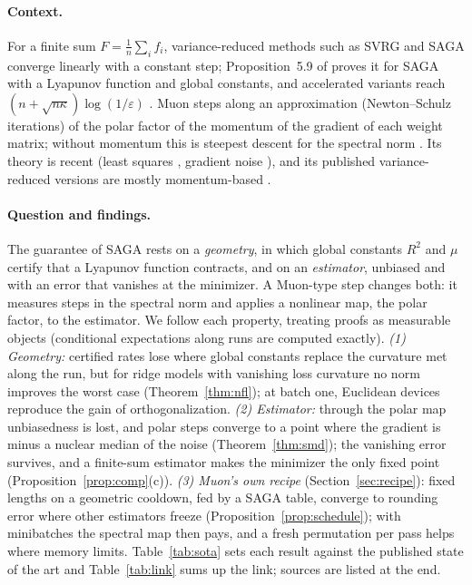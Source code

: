\documentclass[10pt]{article}
\theoremstyle{remark}
\begin{document}
\paragraph{Context.} For a finite sum $F=\frac1n\sum_if_i$, variance-reduced methods such as SVRG
\cite{johnson2013accelerating} and SAGA \cite{defazio2014saga} converge linearly with a constant step; Proposition~5.9 of
\cite{bach2024learning} proves it for SAGA with a Lyapunov function and global constants, and accelerated variants reach
$(n+\sqrt{n\kappa})\log(1/\varepsilon)$ \cite{allenzhu2018katyusha,kovalev2020dont,lan2018optimal}. Muon
\cite{jordan2024muon} steps along an approximation (Newton--Schulz iterations) of the polar factor of the momentum of the
gradient of each weight matrix; without momentum this is steepest descent for the spectral norm
\cite{carlson2015stochastic,bernstein2024old}. Its theory is recent (least squares
\cite{shulgin2026quadratic,vasudeva2025muon}, gradient noise \cite{xie2026muon,chen2026when,paquette2026phases}), and its
published variance-reduced versions are mostly momentum-based \cite{liu2025marsm}.

\paragraph{Question and findings.} The guarantee of SAGA rests on a \emph{geometry}, in which global constants $R^2$ and
$\mu$ certify that a Lyapunov function contracts, and on an \emph{estimator}, unbiased and with an error that vanishes at
the minimizer. A Muon-type step changes both: it measures steps in the spectral norm and applies a nonlinear map, the
polar factor, to the estimator. We follow each property, treating proofs as measurable objects (conditional
expectations along runs are computed exactly). \emph{(1) Geometry:} certified rates lose where global constants replace
the curvature met along the run, but for ridge models with vanishing loss curvature no norm improves the worst case
(Theorem~\ref{thm:nfl}); at batch one, Euclidean devices reproduce the gain of orthogonalization. \emph{(2) Estimator:}
through the polar map unbiasedness is lost, and polar steps converge to a point where the gradient is minus a nuclear
median of the noise (Theorem~\ref{thm:smd}); the vanishing error survives, and a finite-sum estimator makes the
minimizer the only fixed point (Proposition~\ref{prop:comp}(c)). \emph{(3) Muon's own recipe}
(Section~\ref{sec:recipe}): fixed lengths on a geometric cooldown, fed by a SAGA table, converge to rounding error where
other estimators freeze (Proposition~\ref{prop:schedule}); with minibatches the spectral map then pays, and a fresh
permutation per pass helps where memory limits. Table~\ref{tab:sota} sets each result against the published state of
the art and Table~\ref{tab:link} sums up the link; sources are listed at the end.
\end{document}
